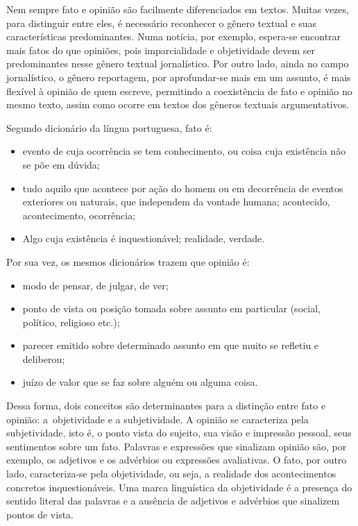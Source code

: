 Nem sempre fato e opinião são facilmente diferenciados em textos. Muitas
vezes, para distinguir entre eles, é necessário reconhecer o gênero
textual e suas características predominantes. Numa notícia, por exemplo,
espera-se encontrar mais fatos do que opiniões, pois imparcialidade e
objetividade devem ser predominantes nesse gênero textual jornalístico.
Por outro lado, ainda no campo jornalístico, o gênero reportagem, por
aprofundar-se mais em um assunto, é mais flexível à opinião de quem
escreve, permitindo a coexistência de fato e opinião no mesmo texto,
assim como ocorre em textos dos gêneros textuais argumentativos.

Segundo dicionário da língua portuguesa, fato é:

\begin{itemize}
\tightlist
\item
  evento de cuja ocorrência se tem conhecimento, ou coisa cuja
  existência não se põe em dúvida;
\item
  tudo aquilo que acontece por ação do homem ou em decorrência de
  eventos exteriores ou naturais, que independem da vontade humana;
  acontecido, acontecimento, ocorrência;
\item
  Algo cuja existência é inquestionável; realidade, verdade.
\end{itemize}

Por sua vez, os mesmos dicionários trazem que opinião é:

\begin{itemize}
\tightlist
\item
  modo de pensar, de julgar, de ver;
\item
  ponto de vista ou posição tomada sobre assunto em particular (social,
  político, religioso etc.);
\item
  parecer emitido sobre determinado assunto em que muito se refletiu e
  deliberou;
\item
  juízo de valor que se faz sobre alguém ou alguma coisa.
\end{itemize}

Dessa forma, dois conceitos são determinantes para a distinção entre
fato e opinião: a~objetividade e a subjetividade. A opinião se
caracteriza pela subjetividade, isto é, o ponto vista do sujeito, sua
visão e impressão pessoal, seus sentimentos sobre um fato. Palavras e
expressões que sinalizam opinião são, por exemplo, os adjetivos e os
advérbios ou expressões avaliativas. O fato, por outro lado,
caracteriza-se pela objetividade, ou seja, a realidade dos
acontecimentos concretos inquestionáveis. Uma marca linguística da
objetividade é a presença do sentido literal das palavras e a ausência
de adjetivos e advérbios que sinalizem pontos de vista.

